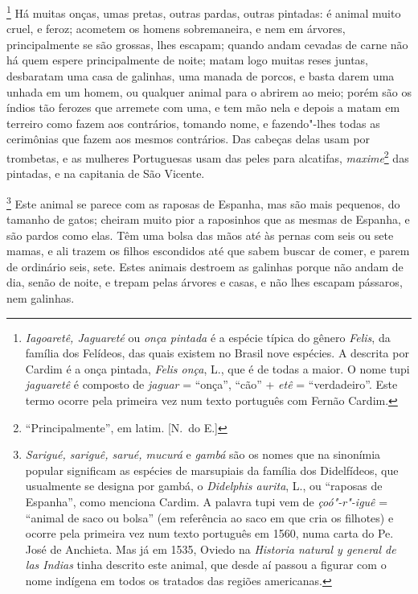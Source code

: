 \footnote{ \textit{Iagoaretê, Jaguareté} ou
\textit{onça pintada } é a espécie típica do gênero \textit{Felis}, da
família dos Felídeos, das quais existem no Brasil nove espécies. A
descrita por Cardim é a onça pintada, \textit{Felis onça}, L., que é de
todas a maior. O nome tupi \textit{jaguaretê} é composto de
\textit{jaguar} = ``onça'', ``cão'' + \textit{etê} = ``verdadeiro''. Este
termo ocorre pela primeira vez num texto português com Fernão Cardim.} 
Há muitas onças, umas pretas, outras pardas, outras pintadas: é animal
muito cruel, e feroz; acometem os homens sobremaneira, e nem em
árvores, principalmente se são grossas, lhes escapam; quando andam
cevadas de carne não há quem espere principalmente de noite; matam logo
muitas reses juntas, desbaratam uma casa de galinhas, uma manada de
porcos, e basta darem uma unhada em um homem, ou qualquer animal para o
abrirem ao meio; porém são os índios tão ferozes que arremete com uma,
e tem mão nela e depois a matam em terreiro como fazem aos contrários,
tomando nome, e fazendo"-lhes todas as cerimônias que fazem aos mesmos
contrários. Das cabeças delas usam por trombetas, e as mulheres
Portuguesas usam das peles para alcatifas, \textit{maxime}\footnote{ ``Principalmente'', em latim. [N.~do E.]} das pintadas, e na
capitania de São Vicente.

\footnote{ \textit{Sarigué, sariguê, sarué,
mucurá} e \textit{gambá} são os nomes que na sinonímia popular
significam as espécies de marsupiais da família dos Didelfídeos, que
usualmente se designa por gambá, o \textit{Didelphis aurita}, 
L., ou ``raposas de Espanha'', como menciona Cardim. A
palavra tupi vem de \textit{çoó"-r"-iguê} = ``animal de saco ou bolsa'' 
(em referência ao saco em que cria os filhotes) e ocorre pela primeira
vez num texto português em 1560, numa carta do Pe. José de
Anchieta. Mas já em 1535, Oviedo na \textit{Historia natural y general
de las Indias} tinha descrito este animal, que desde aí passou a
figurar com o nome indígena em todos os tratados das regiões
americanas.} Este animal se parece com as raposas de Espanha,
mas são mais pequenos, do tamanho de gatos; cheiram muito pior a
raposinhos que as mesmas de Espanha, e são pardos como elas. Têm uma
bolsa das mãos até às pernas com seis ou sete mamas, e ali trazem os
filhos escondidos até que sabem buscar de comer, e parem de ordinário
seis, sete. Estes animais destroem as galinhas porque não andam de dia,
senão de noite, e trepam pelas árvores e casas, e não lhes escapam
pássaros, nem galinhas. 

